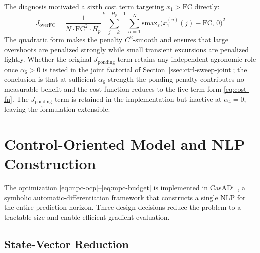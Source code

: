 The diagnosis motivated a sixth cost term targeting $x_1 > \mathrm{FC}$
directly:
\begin{equation}
J_{\mathrm{overFC}} = \frac{1}{N \cdot \mathrm{FC}^2 \cdot H_p}
  \sum_{j=k}^{k+H_p-1} \sum_{n=1}^{N}
  \mathrm{smax}_{\varepsilon}\!\bigl(x_1^{(n)}(j) - \mathrm{FC},\, 0\bigr)^2
\label{eq:J-overfc}
\end{equation}
The quadratic form makes the penalty $C^2$-smooth and ensures that large
overshoots are penalized strongly while small transient excursions are
penalized lightly. Whether the original $J_{\mathrm{ponding}}$ term retains
any independent agronomic role once $\alpha_6 > 0$ is tested in the joint
factorial of Section~\ref{ssec:ctrl-sweep-joint}; the conclusion is that at
sufficient $\alpha_6$ strength the ponding penalty contributes no measurable
benefit and the cost function reduces to the five-term form
\eqref{eq:cost-fn}. The $J_{\mathrm{ponding}}$ term is retained in the
implementation but inactive at $\alpha_4 = 0$, leaving the formulation
extensible.

\section{Control-Oriented Model and NLP Construction}
\label{sec:ctrl-com}

The optimization \eqref{eq:mpc-ocp}--\eqref{eq:mpc-budget} is implemented
in CasADi~\cite{andersson2019casadi}, a symbolic automatic-differentiation
framework that constructs a single NLP for the entire prediction horizon.
Three design decisions reduce the problem to a tractable size and enable
efficient gradient evaluation.

\subsection{State-Vector Reduction}
\label{ssec:ctrl-state-reduction}

